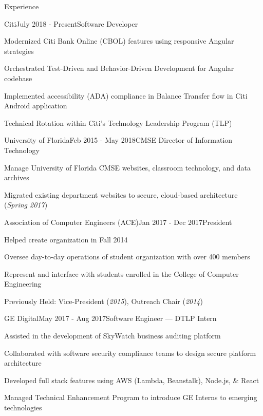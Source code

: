 \documentclass{resume} %
\begin{document}
\begin{rSection}{Experience}

\begin{rSubsection}{Citi}{July 2018 - Present}{Software Developer}{}
\setlength{\itemindent}{.25in}
\item Modernized Citi Bank Online (CBOL) features using responsive Angular strategies
\item Orchestrated Test-Driven and Behavior-Driven Development for Angular codebase
\item Implemented accessibility (ADA) compliance in Balance Transfer flow in Citi Android application
\item Technical Rotation within Citi's Technology Leadership Program (TLP)
\end{rSubsection}

\begin{rSubsection}{University of Florida}{Feb 2015 - May 2018}{CMSE Director of Information Technology}{}
\setlength{\itemindent}{.25in}
\item Manage University of Florida CMSE websites, classroom technology, and data archives
\item Migrated existing department websites to secure, cloud-based architecture (\textit{Spring 2017})
\end{rSubsection}

\begin{rSubsection}{Association of Computer Engineers (ACE)}{Jan 2017 - Dec 2017}{President}{}
\setlength{\itemindent}{.25in}
\item Helped create organization in Fall 2014
\item Oversee day-to-day operations of student organization with over 400 members
\item Represent and interface with students enrolled in the College of Computer Engineering
\item Previously Held: Vice-President (\textit{2015}), Outreach Chair (\textit{2014})
\end{rSubsection}

\begin{rSubsection}{GE Digital}{May 2017 - Aug 2017}{Software Engineer --- DTLP Intern}{}
\setlength{\itemindent}{.25in}
\item Assisted in the development of SkyWatch business auditing platform
\item Collaborated with software security compliance teams to design secure platform architecture
\item Developed full stack features using AWS (Lambda, Beanstalk), Node.js, \& React
\item Managed Technical Enhancement Program to introduce GE Interns to emerging technologies
\end{rSubsection}


\end{rSection}
\end{document}
